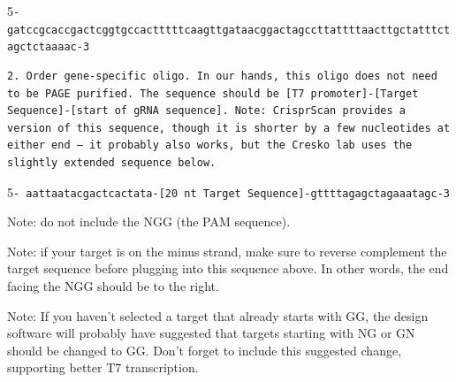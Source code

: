 \documentclass[
  letterpaper,
  DIV=11,
  numbers=noendperiod]{scrreprt}
\begin{document}
5\texttt{-gatccgcaccgactcggtgccactttttcaagttgataacggactagccttattttaacttgctatttctagctctaaaac-3}

\begin{verbatim}
2. Order gene-specific oligo. In our hands, this oligo does not need to be PAGE purified. The sequence should be [T7 promoter]-[Target Sequence]-[start of gRNA sequence]. Note: CrisprScan provides a version of this sequence, though it is shorter by a few nucleotides at either end – it probably also works, but the Cresko lab uses the slightly extended sequence below. 
\end{verbatim}

5\texttt{-\ aattaatacgactcactata-{[}20\ nt\ Target\ Sequence{]}-gttttagagctagaaatagc-3}

\begin{tcolorbox}[enhanced jigsaw, rightrule=.15mm, title=\textcolor{quarto-callout-note-color}{\faInfo}\hspace{0.5em}{Notes}, titlerule=0mm, opacitybacktitle=0.6, toprule=.15mm, bottomrule=.15mm, opacityback=0, left=2mm, colframe=quarto-callout-note-color-frame, breakable, coltitle=black, colback=white, colbacktitle=quarto-callout-note-color!10!white, bottomtitle=1mm, leftrule=.75mm, toptitle=1mm, arc=.35mm]

Note: do not include the NGG (the PAM sequence).

Note: if your target is on the minus strand, make sure to reverse
complement the target sequence before plugging into this sequence above.
In other words, the end facing the NGG should be to the right.

Note: If you haven't selected a target that already starts with GG, the
design software will probably have suggested that targets starting with
NG or GN should be changed to GG. Don't forget to include this suggested
change, supporting better T7 transcription.

\end{tcolorbox}
\end{document}
